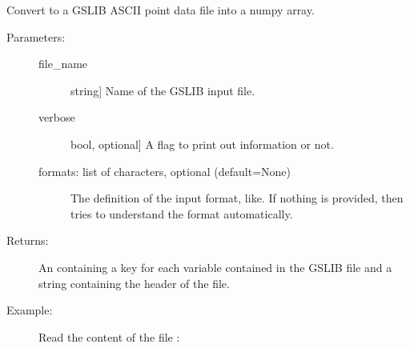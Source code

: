 \documentclass[letterpaper,10pt,english]{sphinxmanual}
\begin{document}
\begin{fulllineitems}
\label{\detokenize{appendices:s2Dcd.gslibnumpy.gslib_points2numpy}}
Convert to a GSLIB ASCII point data file into a numpy array.
\begin{description}
\item[{Parameters:}] \leavevmode\begin{description}
\item[{file\_name}] \leavevmode{[}string{]}
Name of the GSLIB input file.

\item[{verbose}] \leavevmode{[}bool, optional{]}
A flag to print out information or not.

\item[{formats: list of characters, optional (default=None)}] \leavevmode
The definition of the input format,
 like.  If nothing is provided,
then  tries to understand the format
automatically.

\end{description}

\item[{Returns:}] \leavevmode
An  containing a key for each variable contained in
the GSLIB file and a string containing the header of the file.

\item[{Example:}] \leavevmode
Read the content of the file :

\begin{sphinxVerbatim}[commandchars=\\\{\}]
  
  \PYG{p}{[}\PYG{p}{]}
\end{sphinxVerbatim}

\end{description}

\end{fulllineitems}

\end{document}
